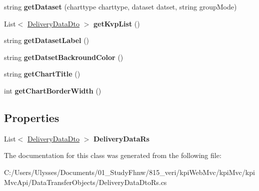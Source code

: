 \begin{DoxyCompactItemize}
\mbox{\label{classkpi_mvc_api_1_1_data_transfer_objects_1_1_delivery_data_dto_rs_aeb50241c1126f86bd7c3a34b829bfa99}} 
string {\bfseries get\+Dataset} (charttype charttype, dataset datset, string group\+Mode)
\item 
\mbox{\label{classkpi_mvc_api_1_1_data_transfer_objects_1_1_delivery_data_dto_rs_ab074181fa2c9dc804bb1e435e8f563f0}} 
List$<$ \hyperlink{classkpi_mvc_api_1_1_data_transfer_objects_1_1_delivery_data_dto}{Delivery\+Data\+Dto} $>$ {\bfseries get\+Kvp\+List} ()
\item 
\mbox{\label{classkpi_mvc_api_1_1_data_transfer_objects_1_1_delivery_data_dto_rs_a8409245fef6ebe61c3ca608363b8ca59}} 
string {\bfseries get\+Dataset\+Label} ()
\item 
\mbox{\label{classkpi_mvc_api_1_1_data_transfer_objects_1_1_delivery_data_dto_rs_a963e855134d343e9686771929910db26}} 
string {\bfseries get\+Datset\+Backround\+Color} ()
\item 
\mbox{\label{classkpi_mvc_api_1_1_data_transfer_objects_1_1_delivery_data_dto_rs_a5604f97bdcb8087efa4ac924e928e00a}} 
string {\bfseries get\+Chart\+Title} ()
\item 
\mbox{\label{classkpi_mvc_api_1_1_data_transfer_objects_1_1_delivery_data_dto_rs_a91f1349a7d1f86bbb2a75faa9c99595f}} 
int {\bfseries get\+Chart\+Border\+Width} ()
\end{DoxyCompactItemize}
\subsection*{Properties}
\begin{DoxyCompactItemize}
\item 
\mbox{\label{classkpi_mvc_api_1_1_data_transfer_objects_1_1_delivery_data_dto_rs_ad533bafa32f72f2a3b008d5004bd1d1f}} 
List$<$ \hyperlink{classkpi_mvc_api_1_1_data_transfer_objects_1_1_delivery_data_dto}{Delivery\+Data\+Dto} $>$ {\bfseries Delivery\+Data\+Rs}
\end{DoxyCompactItemize}


The documentation for this class was generated from the following file\+:\begin{DoxyCompactItemize}
\item 
C\+:/\+Users/\+Ulysses/\+Documents/01\+\_\+\+Study\+Fhnw/815\+\_\+veri/kpi\+Web\+Mvc/kpi\+Mvc/kpi\+Mvc\+Api/\+Data\+Transfer\+Objects/Delivery\+Data\+Dto\+Rs.\+cs\end{DoxyCompactItemize}
